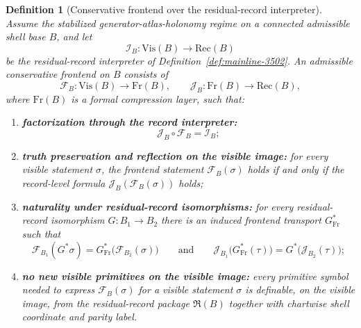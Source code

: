\documentclass[12pt,a4paper]{article}
\newtheorem{definition}[theorem]{Definition}
\begin{document}
\begin{definition}[Conservative frontend over the residual-record interpreter]
\label{def:mainline-3600}
Assume the stabilized generator-atlas-holonomy regime on a connected admissible shell base $B$, and let
\[
 \mathcal I_B : \mathrm{Vis}(B) \longrightarrow \mathrm{Rec}(B)
\]
be the residual-record interpreter of Definition~\ref{def:mainline-3502}. An \emph{admissible conservative frontend} on $B$ consists of
\[
 \mathcal F_B : \mathrm{Vis}(B) \longrightarrow \mathrm{Fr}(B),
 \qquad
 \mathcal J_B : \mathrm{Fr}(B) \longrightarrow \mathrm{Rec}(B),
\]
where $\mathrm{Fr}(B)$ is a formal compression layer, such that:
\begin{enumerate}[label=(\roman*), leftmargin=2em]
 \item \textbf{factorization through the record interpreter:}
 \[
 \mathcal J_B\circ \mathcal F_B = \mathcal I_B;
 \]
 \item \textbf{truth preservation and reflection on the visible image:} for every visible statement $\sigma$, the frontend statement $\mathcal F_B(\sigma)$ holds if and only if the record-level formula $\mathcal J_B(\mathcal F_B(\sigma))$ holds;
 \item \textbf{naturality under residual-record isomorphisms:} for every residual-record isomorphism $G:B_1\to B_2$ there is an induced frontend transport $G^*_{\mathrm{Fr}}$ such that
 \[
 \mathcal F_{B_1}(G^*\sigma)=G^*_{\mathrm{Fr}}\bigl(\mathcal F_{B_2}(\sigma)\bigr)
 \qquad\text{and}\qquad
 \mathcal J_{B_1}\bigl(G^*_{\mathrm{Fr}}(\tau)\bigr)=G^*\bigl(\mathcal J_{B_2}(\tau)\bigr);
 \]
 \item \textbf{no new visible primitives on the visible image:} every primitive symbol needed to express $\mathcal F_B(\sigma)$ for a visible statement $\sigma$ is definable, on the visible image, from the residual-record package $\mathfrak R(B)$ together with chartwise shell coordinate and parity label.
\end{enumerate}
\end{definition}
\end{document}
